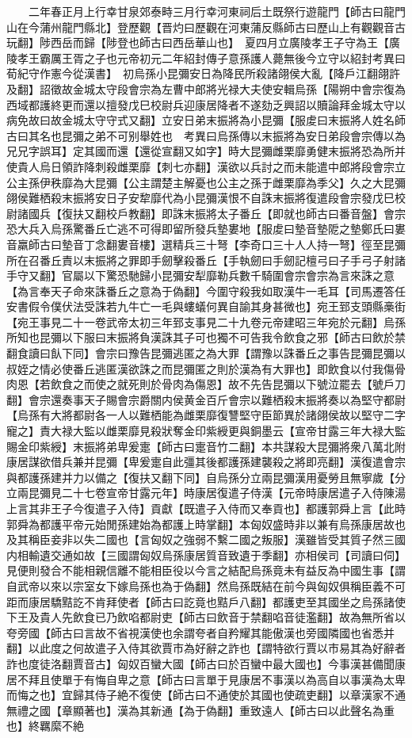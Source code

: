 　　二年春正月上行幸甘泉郊泰畤三月行幸河東祠后土既祭行遊龍門【師古曰龍門山在今蒲州龍門縣北】登歷觀【晋灼曰歷觀在河東蒲反縣師古曰歷山上有觀觀音古玩翻】陟西岳而歸【陟登也師古曰西岳華山也】　夏四月立廣陵孝王子守為王【廣陵孝王霸厲王胥之子也元帝初元二年紹封傳子意孫護人薨無後今立守以紹封考異曰荀紀守作憲今從漢書】　初烏孫小昆彌安日為降民所殺諸翖侯大亂【降戶江翻翖許及翻】詔徵故金城太守段會宗為左曹中郎將光禄大夫使安輯烏孫【陽朔中會宗復為西域都護終更而還以擅發戊巳校尉兵迎康居降者不遂劾乏興詔以贖論拜金城太守以病免故曰故金城太守守式又翻】立安日弟末振將為小昆彌【服䖍曰末振將人姓名師古曰其名也昆彌之弟不可别舉姓也　考異曰烏孫傳以末振將為安日弟段會宗傳以為兄兄字誤耳】定其國而還【還從宣翻又如字】時大昆彌雌栗靡勇健末振將恐為所并使貴人烏日領詐降刺殺雌栗靡【刺七亦翻】漢欲以兵討之而未能遣中郎將段會宗立公主孫伊秩靡為大昆彌【公主謂楚主解憂也公主之孫于雌栗靡為季父】久之大昆彌翖侯難栖殺末振將安日子安犂靡代為小昆彌漢恨不自誅末振將復遣段會宗發戊巳校尉諸國兵【復扶又翻校戶教翻】即誅末振將太子番丘【即就也師古曰番音盤】會宗恐大兵入烏孫驚番丘亡逃不可得即留所發兵墊婁地【服䖍曰墊音墊阸之墊鄭氏曰婁音羸師古曰墊音丁念翻婁音樓】選精兵三十弩【李奇口三十人人持一弩】徑至昆彌所在召番丘責以末振將之罪即手劒擊殺番丘【手執劒曰手劒記檀弓曰子手弓子射諸手守又翻】官屬以下驚恐馳歸小昆彌安犁靡勒兵數千騎圍會宗會宗為言來誅之意【為言奉天子命來誅番丘之意為于偽翻】今圍守殺我如取漢牛一毛耳【司馬遷答任安書假令僕伏法受誅若九牛亡一毛與螻蟻何異自諭其身甚微也】宛王郅支頭縣槀街【宛王事見二十一卷武帝太初三年郅支事見二十九卷元帝建昭三年宛於元翻】烏孫所知也昆彌以下服曰末振將負漢誅其子可也獨不可告我令飲食之邪【師古曰飲於禁翻食讀曰飤下同】會宗曰豫告昆彌逃匿之為大罪【謂豫以誅番丘之事告昆彌昆彌以叔姪之情必使番丘逃匿漢欲誅之而昆彌匿之則於漢為有大罪也】即飲食以付我傷骨肉恩【若飲食之而使之就死則於骨肉為傷恩】故不先告昆彌以下號泣罷去【號戶刀翻】會宗還奏事天子賜會宗爵關内侯黄金百斤會宗以難栖殺末振將奏以為堅守都尉【烏孫有大將都尉各一人以難栖能為雌栗靡復讐堅守臣節異於諸翖侯故以堅守二字寵之】責大禄大監以雌栗靡見殺狀奪金印紫綬更與銅墨云【宣帝甘露三年大禄大監賜金印紫綬】末振將弟卑爰疐【師古曰疐音竹二翻】本共謀殺大昆彌將衆八萬北附康居謀欲借兵兼并昆彌【卑爰疐自此彊其後都護孫建襲殺之將即亮翻】漢復遣會宗與都護孫建并力以備之【復扶又翻下同】自烏孫分立兩昆彌漢用憂勞且無寧歲【分立兩昆彌見二十七卷宣帝甘露元年】時康居復遣子侍漢【元帝時康居遣子入侍陳湯上言其非王子今復遣子入侍】貢獻【既遣子入侍而又奉貢也】都護郭舜上言【此時郭舜為都護平帝元始閒孫建始為都護上時掌翻】本匈奴盛時非以兼有烏孫康居故也及其稱臣妾非以失二國也【言匈奴之強弱不繫二國之叛服】漢雖皆受其質子然三國内相輸遺交通如故【三國謂匈奴烏孫康居質音致遺于季翻】亦相侯司【司讀曰伺】見便則發合不能相親信離不能相臣役以今言之結配烏孫竟未有益反為中國生事【謂自武帝以來以宗室女下嫁烏孫也為于偽翻】然烏孫既結在前今與匈奴俱稱臣義不可距而康居驕黠訖不肯拜使者【師古曰訖竟也黠戶八翻】都護吏至其國坐之烏孫諸使下王及貴人先飲食已乃飲啗都尉吏【師古曰飲音于禁翻啗音徒濫翻】故為無所省以夸旁國【師古曰言故不省視漢使也余謂夸者自矜耀其能傲漢也旁國隣國也省悉并翻】以此度之何故遣子入侍其欲賈市為好辭之詐也【謂特欲行賈以市易其為好辭者詐也度徒洛翻賈音古】匈奴百蠻大國【師古曰於百蠻中最大國也】今事漢甚備聞康居不拜且使單于有悔自卑之意【師古曰言單于見康居不事漢以為高自以事漢為太卑而悔之也】宜歸其侍子絶不復使【師古曰不通使於其國也使疏吏翻】以章漢家不通無禮之國【章顯著也】漢為其新通【為于偽翻】重致遠人【師古曰以此聲名為重也】終羈縻不絶

